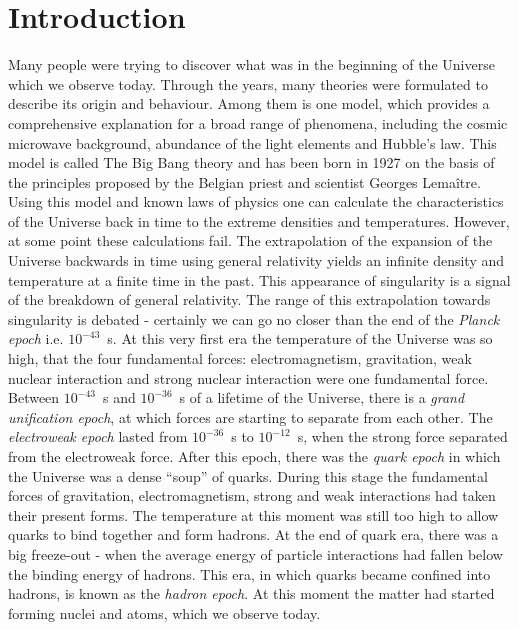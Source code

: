 \chapter*{Introduction}
Many people were trying to discover what was in the beginning of the Universe which we observe today.
Through the years, many theories were formulated to describe its origin and behaviour.
Among them is one model, which provides a comprehensive explanation for a broad range of phenomena, including the cosmic microwave background, abundance of the light elements and Hubble's law.
This model is called The Big Bang theory and has been born in 1927 on the basis of the principles proposed by the Belgian priest and scientist Georges Lema{\^i}tre.
Using this model and known laws of physics one can calculate the characteristics of the Universe back in time to the extreme densities and temperatures.
However, at some point these calculations fail.
The extrapolation of the expansion of the Universe backwards in time using general relativity yields an infinite density and temperature at a finite time in the past.
This appearance of singularity is a signal of the breakdown of general relativity.
The range of this extrapolation towards singularity is debated - certainly we can go no closer than the end of the \textit{Planck epoch} i.e. $10^{-43}$~s.
At this very first era the temperature of the Universe was so high, that the four fundamental forces: electromagnetism, gravitation, weak nuclear interaction and strong nuclear interaction were one fundamental force.
Between $10^{-43}$~s and $10^{-36}$~s of a lifetime of the Universe, there is a \textit{grand unification epoch}, at which forces are starting to separate from each other.
The \textit{electroweak epoch} lasted from $10^{-36}$~s to $10^{-12}$~s, when the strong force separated from the electroweak force.
After this epoch, there was the \textit{quark epoch} in which the Universe was a dense ``soup'' of quarks.
During this stage the fundamental forces of gravitation, electromagnetism, strong and weak interactions had taken their present forms. 
The temperature at this moment was still too high to allow quarks to bind together and form hadrons.
At the end of quark era, there was a big freeze-out - when the average energy of particle interactions had fallen below the binding energy of hadrons.
This era, in which quarks became confined into hadrons, is known as the \textit{hadron epoch}.
At this moment the matter had started forming nuclei and atoms, which we observe today.

